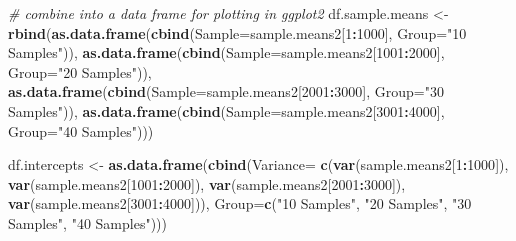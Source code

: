 \documentclass[]{article}
\newenvironment{Shaded}{\begin{snugshade}}{\end{snugshade}}
\newcommand{\KeywordTok}[1]{\textcolor[rgb]{0.13,0.29,0.53}{\textbf{#1}}}
\newcommand{\DataTypeTok}[1]{\textcolor[rgb]{0.13,0.29,0.53}{#1}}
\newcommand{\DecValTok}[1]{\textcolor[rgb]{0.00,0.00,0.81}{#1}}
\newcommand{\StringTok}[1]{\textcolor[rgb]{0.31,0.60,0.02}{#1}}
\newcommand{\CommentTok}[1]{\textcolor[rgb]{0.56,0.35,0.01}{\textit{#1}}}
\newcommand{\OperatorTok}[1]{\textcolor[rgb]{0.81,0.36,0.00}{\textbf{#1}}}
\newcommand{\NormalTok}[1]{#1}
\begin{document}
\begin{Shaded}
\begin{Highlighting}[]
\CommentTok{# combine into a data frame for plotting in ggplot2}
\NormalTok{df.sample.means <-}\StringTok{ }\KeywordTok{rbind}\NormalTok{(}\KeywordTok{as.data.frame}\NormalTok{(}\KeywordTok{cbind}\NormalTok{(}\DataTypeTok{Sample=}\NormalTok{sample.means2[}\DecValTok{1}\OperatorTok{:}\DecValTok{1000}\NormalTok{], }\DataTypeTok{Group=}\StringTok{"10 Samples"}\NormalTok{)),}
                         \KeywordTok{as.data.frame}\NormalTok{(}\KeywordTok{cbind}\NormalTok{(}\DataTypeTok{Sample=}\NormalTok{sample.means2[}\DecValTok{1001}\OperatorTok{:}\DecValTok{2000}\NormalTok{], }\DataTypeTok{Group=}\StringTok{"20 Samples"}\NormalTok{)),}
                         \KeywordTok{as.data.frame}\NormalTok{(}\KeywordTok{cbind}\NormalTok{(}\DataTypeTok{Sample=}\NormalTok{sample.means2[}\DecValTok{2001}\OperatorTok{:}\DecValTok{3000}\NormalTok{], }\DataTypeTok{Group=}\StringTok{"30 Samples"}\NormalTok{)),}
                         \KeywordTok{as.data.frame}\NormalTok{(}\KeywordTok{cbind}\NormalTok{(}\DataTypeTok{Sample=}\NormalTok{sample.means2[}\DecValTok{3001}\OperatorTok{:}\DecValTok{4000}\NormalTok{], }\DataTypeTok{Group=}\StringTok{"40 Samples"}\NormalTok{)))}

\NormalTok{df.intercepts <-}\StringTok{ }\KeywordTok{as.data.frame}\NormalTok{(}\KeywordTok{cbind}\NormalTok{(}\DataTypeTok{Variance=} \KeywordTok{c}\NormalTok{(}\KeywordTok{var}\NormalTok{(sample.means2[}\DecValTok{1}\OperatorTok{:}\DecValTok{1000}\NormalTok{]),}
                                                \KeywordTok{var}\NormalTok{(sample.means2[}\DecValTok{1001}\OperatorTok{:}\DecValTok{2000}\NormalTok{]),}
                                                \KeywordTok{var}\NormalTok{(sample.means2[}\DecValTok{2001}\OperatorTok{:}\DecValTok{3000}\NormalTok{]),}
                                                \KeywordTok{var}\NormalTok{(sample.means2[}\DecValTok{3001}\OperatorTok{:}\DecValTok{4000}\NormalTok{])),}
                               \DataTypeTok{Group=}\KeywordTok{c}\NormalTok{(}\StringTok{"10 Samples"}\NormalTok{, }\StringTok{"20 Samples"}\NormalTok{, }\StringTok{"30 Samples"}\NormalTok{, }\StringTok{"40 Samples"}\NormalTok{)))}


\end{Highlighting}
\end{Shaded}
\end{document}
